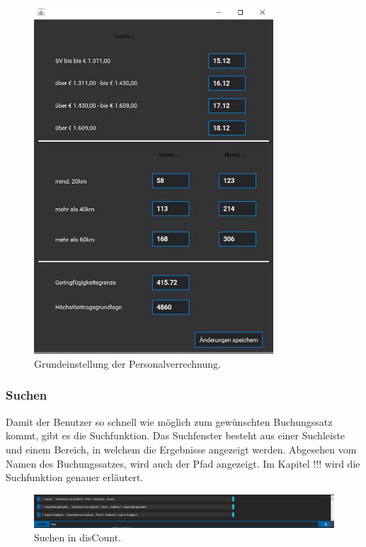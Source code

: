 \documentclass[12pt]{report}
\begin{document}
\begin{figure}[h]
	\centering
	\includegraphics[height=13cm]{images/einstellungen}
	\caption[Einstellungen]{Grundeinstellung der Personalverrechnung.}
\end{figure}

\subsubsection{Suchen}
Damit der Benutzer so schnell wie möglich zum gewünschten Buchungssatz kommt, gibt es die Suchfunktion. Das Suchfenster besteht aus einer Suchleiste und einem Bereich, in welchem die Ergebnisse angezeigt werden. Abgesehen vom Namen des Buchungssatzes, wird auch der Pfad angezeigt. Im Kapitel !!! wird die Suchfunktion genauer erläutert.

\begin{figure}[h]
	\centering
	\includegraphics[width=16cm]{images/suchen}
	\caption[Suchen]{Suchen in disCount.}
\end{figure}
\end{document}
